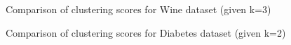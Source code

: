 \begin{figure}[H]
	\qquad
	
	\caption{Comparison of clustering scores for Wine dataset (given k=3)}%
	\label{fig:comparison_wine}
\end{figure}

\begin{figure}[H]
	\centering
	
	\caption{Comparison of clustering scores for Diabetes dataset (given k=2)}%
	\label{fig:comparison_diabetes}
\end{figure}

